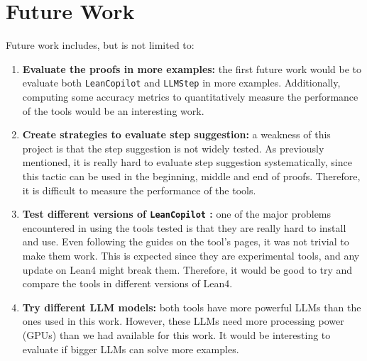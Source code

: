 \documentclass[12pt]{article}
\newcommand{\leancopilot}{\texttt{LeanCopilot} }
\newcommand{\llmstep}{\texttt{LLMStep} }
\begin{document}
\section{Future Work} \label{sec:futurework}

Future work includes, but is not limited to:

\begin{enumerate}[label=(\arabic*)]
  \item \textbf{Evaluate the proofs in more examples:} the first future work would be to evaluate both \leancopilot and \llmstep in more examples. Additionally, computing some accuracy metrics to quantitatively measure the performance of the tools would be an interesting work.
  \item \textbf{Create strategies to evaluate step suggestion:} a weakness of this project is that the step suggestion is not widely tested. As previously mentioned, it is really hard to evaluate step suggestion systematically, since this tactic can be used in the beginning, middle and end of proofs. Therefore, it is difficult to measure the performance of the tools.
  \item \textbf{Test different versions of \leancopilot:} one of the major problems encountered in using the tools tested is that they are really hard to install and use. Even following the guides on the tool's pages, it was not trivial to make them work. This is expected since they are experimental tools, and any update on Lean4 might break them. Therefore, it would be good to try and compare the tools in different versions of Lean4.
  \item \textbf{Try different LLM models:} both tools have more powerful LLMs than the ones used in this work. However, these LLMs need more processing power (GPUs) than we had available for this work. It would be interesting to evaluate if bigger LLMs can solve more examples.
\end{enumerate}


\end{document}
